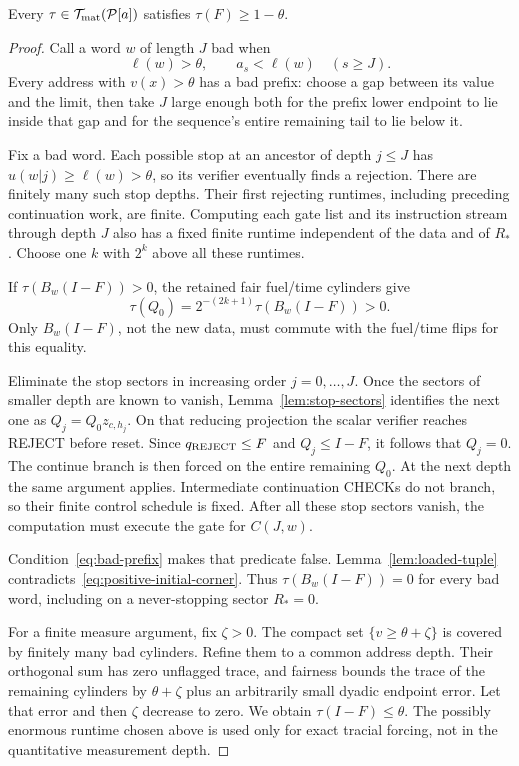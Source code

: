 \begin{proposition}\label{prop:limit-flag-lower}
Every $\tau\in\mathcal T_{\rm mat}(\mathcal P[a])$ satisfies $\tau(F)\ge1-\theta$.
\end{proposition}
\begin{proof}
Call a word $w$ of length $J$ bad when
\begin{equation}\label{eq:bad-prefix}
 \ell(w)>\theta,\qquad a_s<\ell(w)\quad(s\ge J).
\end{equation}
Every address with $v(x)>\theta$ has a bad prefix: choose a gap between its value and the limit, then take $J$ large enough both for the prefix lower endpoint to lie inside that gap and for the sequence's entire remaining tail to lie below it.

Fix a bad word. Each possible stop at an ancestor of depth $j\le J$ has $u(w|j)\ge\ell(w)>\theta$, so its verifier eventually finds a rejection. There are finitely many such stop depths. Their first rejecting runtimes, including preceding continuation work, are finite. Computing each gate list and its instruction stream through depth $J$ also has a fixed finite runtime independent of the data and of $R_*$. Choose one $k$ with $2^k$ above all these runtimes.

If $\tau(B_w(I-F))>0$, the retained fair fuel/time cylinders give
\begin{equation}\label{eq:positive-initial-corner}
 \tau(Q_0)=2^{-(2k+1)}\tau(B_w(I-F))>0.
\end{equation}
Only $B_w(I-F)$, not the new data, must commute with the fuel/time flips for this equality.

Eliminate the stop sectors in increasing order $j=0,\ldots,J$. Once the sectors of smaller depth are known to vanish, Lemma~\ref{lem:stop-sectors} identifies the next one as $Q_j=Q_0z_{c,h_j}$. On that reducing projection the scalar verifier reaches REJECT before reset. Since $q_{\rm REJECT}\le F$ and $Q_j\le I-F$, it follows that $Q_j=0$. The continue branch is then forced on the entire remaining $Q_0$. At the next depth the same argument applies. Intermediate continuation CHECKs do not branch, so their finite control schedule is fixed. After all these stop sectors vanish, the computation must execute the gate for $C(J,w)$.

Condition~\eqref{eq:bad-prefix} makes that predicate false. Lemma~\ref{lem:loaded-tuple} contradicts~\eqref{eq:positive-initial-corner}. Thus $\tau(B_w(I-F))=0$ for every bad word, including on a never-stopping sector $R_*=0$.

For a finite measure argument, fix $\zeta>0$. The compact set $\{v\ge\theta+\zeta\}$ is covered by finitely many bad cylinders. Refine them to a common address depth. Their orthogonal sum has zero unflagged trace, and fairness bounds the trace of the remaining cylinders by $\theta+\zeta$ plus an arbitrarily small dyadic endpoint error. Let that error and then $\zeta$ decrease to zero. We obtain $\tau(I-F)\le\theta$. The possibly enormous runtime chosen above is used only for exact tracial forcing, not in the quantitative measurement depth.
\end{proof}

